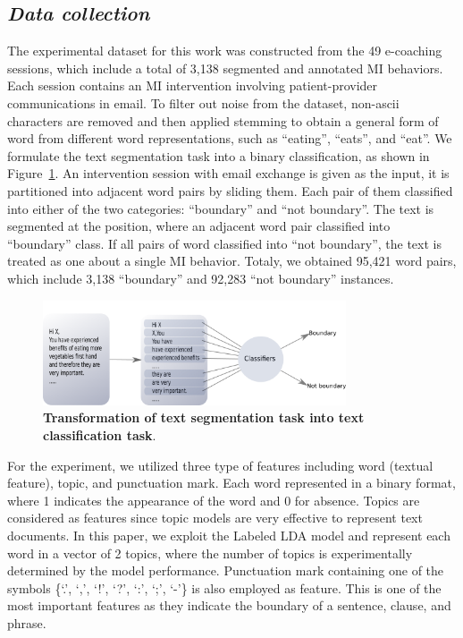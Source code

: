\documentclass{amia}
\begin{document}
\subsection*{\textit{Data collection}}
The experimental dataset for this work was constructed from the 49 e-coaching sessions, which include a total of 3,138 segmented and annotated MI behaviors. Each session contains an MI intervention involving patient-provider communications in email. To filter out noise from the dataset, non-ascii characters are removed and then applied stemming to obtain a general form of word from different word representations, such as ``eating'', ``eats'', and ``eat''. We formulate the text segmentation task into a binary classification, as shown in Figure~\ref{fig:classifier}. An intervention session with email exchange is given as the input, it is partitioned into adjacent word pairs by sliding them. Each pair of them classified into either of the two categories: ``boundary'' and ``not boundary''. The text is segmented at the position, where an adjacent word pair classified into ``boundary'' class. If all pairs of word classified into ``not boundary'', the text is treated as one about a single MI behavior. Totaly, we obtained 95,421 word pairs, which include 3,138 ``boundary'' and 92,283 ``not boundary'' instances.    

\begin{figure}[!htb]
    \centering
    \includegraphics[width=0.80\textwidth]{figures/classifier.png}
    \caption{\textbf{Transformation of text segmentation task into text classification task}.}
    \label{fig:classifier}
\end{figure}


For the experiment, we utilized three type of features including word (textual feature), topic, and punctuation mark. Each word represented in a binary format, where 1 indicates the appearance of the word and 0 for absence. Topics are considered as features since topic models are very effective\cite{kotov2015interpretable,hashimoto2016topic,lu2016modeling} to represent text documents. In this paper, we exploit the Labeled LDA model\cite{kotov2015interpretable} and represent each word in a vector of 2 topics, where the number of topics is experimentally determined by the model performance. Punctuation mark containing one of the symbols \{`.', `,', `!', `?', `:', `;', `-'\} is also employed as feature. This is one of the most important features as they indicate the boundary of a sentence, clause, and phrase.   
\end{document}
